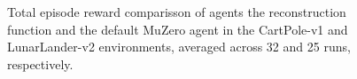 \begin{figure}[ht]
    \caption{Total episode reward comparisson of agents the reconstruction function and the default MuZero agent in the CartPole-v1 and LunarLander-v2 environments, averaged across 32 and 25 runs, respectively.}
    \label{fig:consistency_results}
\end{figure}

